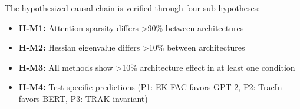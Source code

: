 The hypothesized causal chain is verified through four sub-hypotheses:
\begin{itemize}
\item \textbf{H-M1:} Attention sparsity differs >90\% between architectures
\item \textbf{H-M2:} Hessian eigenvalue differs >10\% between architectures
\item \textbf{H-M3:} All methods show >10\% architecture effect in at least one condition
\item \textbf{H-M4:} Test specific predictions (P1: EK-FAC favors GPT-2, P2: TracIn favors BERT, P3: TRAK invariant)
\end{itemize}
